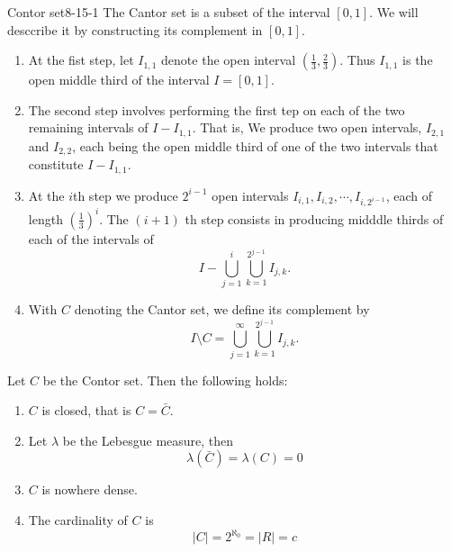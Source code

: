\documentclass[../main.tex]{subfiles}
\begin{document}
\begin{definition}{Contor set}{8-15-1}
    The Cantor set is a subset of the interval \(  \left[ 0,1 \right]   \). We will desccribe it by constructing its complement in \(  \left[ 0,1 \right]   \). 
    \begin{enumerate}
        \item At the fist step, let \(  I_{1,1}  \) denote the open interval \(  \left( \frac{1}{3},\frac{2}{3} \right)   \). Thus \(  I_{1,1}  \) is the open middle third of the interval \(  I= \left[ 0,1 \right]   \). 
        \item The second step involves performing the first tep on each of the two remaining intervals of \(  I-I_{1,1}  \). That is, We produce two open intervals, \(  I_{2,1}  \) and \(  I_{2,2}  \), each being the open middle third of one of the two intervals that constitute \(  I-I_{1,1}  \).
        \item At the \(  i  \)th step we produce \(  2^{i-1}  \) open intervals \(  I_{i,1},I_{i,2},\cdots ,I_{i,2^{i-1}}  \), each of length \(  \left( \frac{1 }{3 }  \right)^{i}   \). The \(  \left( i+ 1 \right)   \) th step consists in producing midddle thirds of each of the intervals of \[
        I- \bigcup _{j= 1}^{i}\bigcup _{k = 1}^{2^{j-1}}I_{j,k}. 
        \]         
        \item With \(  C  \) denoting the Cantor set, we define its complement by \[
        I\setminus C= \bigcup _{j = 1}^{\infty}\bigcup _{k = 1}^{2^{j-1}}I_{j,k}. 
        \] 
    \end{enumerate}
      
\end{definition}

\begin{proposition}{}{}
    Let \(  C  \) be the Contor set. Then the following holds: 
    \begin{enumerate}
        \item \(  C  \) is closed, that is \(  C = \bar{C}  \). 
        \item Let \(   \lambda   \) be the Lebesgue measure, then \[
         \lambda \left( \bar{C} \right)=  \lambda \left( C \right)= 0  
        \]
        \item \(  C  \) is nowhere dense.    
        \item The cardinality of \(  C  \) is \[
        \left| C \right|= 2^{\aleph_0} = \left| R \right|= c 
        \] 
    \end{enumerate}
     
\end{proposition}
\end{document}

